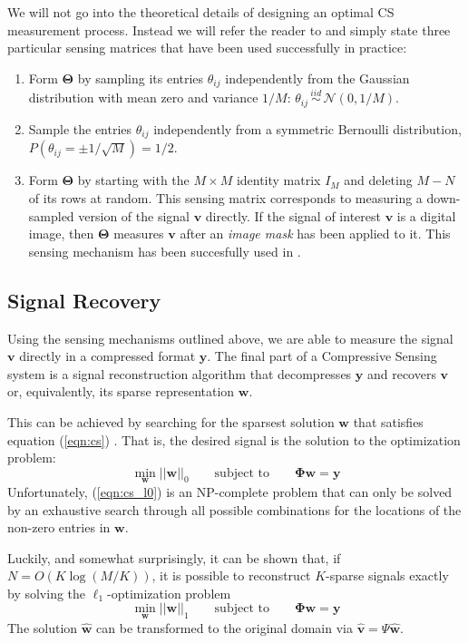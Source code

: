 We will not go into the theoretical details of designing an optimal CS measurement process. Instead we will refer the reader to \cite{candes2008} and simply state three particular sensing matrices that have been used successfully in practice:
\begin{enumerate}
\item Form $\bm\Theta$ by sampling its entries $\theta_{ij}$ independently from the Gaussian distribution with mean zero and variance $1/M$: $\theta_{ij}\, \stackrel{iid}{\sim}\, \mathcal{N}(0,1/M)$.
\item Sample the entries $\theta_{ij}$ independently from a symmetric Bernoulli distribution, $P(\theta_{ij} = \pm 1/\sqrt{M}) = 1/2$. 
\item Form $\bm\Theta$ by starting with the $M\times M$ identity matrix $I_M$ and deleting $M-N$ of its rows at random. This sensing matrix corresponds to measuring a down-sampled version of the signal $\bm v$ directly. If the signal of interest $\bm v$ is a digital image, then $\bm\Theta$ measures $\bm v$ after an \emph{image mask} has been applied to it. This sensing mechanism has been succesfully used in \cite{pilikos2014}.
\end{enumerate}

\subsection{Signal Recovery}
Using the sensing mechanisms outlined above, we are able to measure the signal $\bm v$ directly in a compressed format $\bm y$.
The final part of a Compressive Sensing system is a signal reconstruction algorithm that decompresses $\bm y$ and recovers $\bm v$ or, equivalently, its sparse representation $\bm w$.

This can be achieved by searching for the sparsest solution $\bm w$ that satisfies equation (\ref{eqn:cs}) \cite{baraniuk2007}.
That is, the desired signal is the solution to the optimization problem:
\begin{equation}
\label{eqn:cs_l0}
  \min_{\bm w} ||\bm w||_0 \qquad \mbox{subject to} \qquad \bm\Phi\bm w = \bm y
\end{equation}
Unfortunately, (\ref{eqn:cs_l0}) is an NP-complete problem that can only be solved by an exhaustive search through all possible combinations for the locations of the non-zero entries in $\bm w$.

Luckily, and somewhat surprisingly, it can be shown that, if $N = O(K\log(M/K))$, it is possible to reconstruct $K$-sparse signals exactly by solving the $\ell_1$-optimization problem \cite{baraniuk2007,candes2008}
\begin{equation}
\label{eqn:cs_l1}
  \min_{\bm w} ||\bm w||_1 \qquad \mbox{subject to} \qquad \bm\Phi\bm w = \bm y
\end{equation}
The solution $\bm{\hat w}$ can be transformed to the original domain via $\bm{\hat v} = \Psi\bm{\hat w}$.

